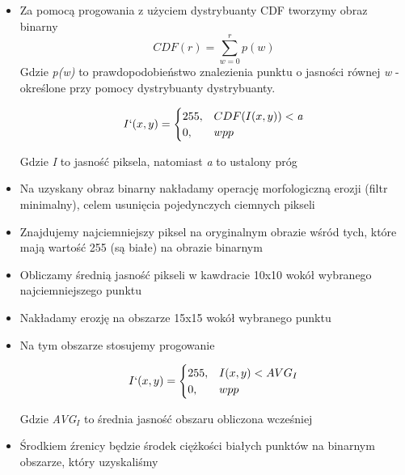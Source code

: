 \documentclass[10pt, a4paper]{article}
\begin{document}
\begin{itemize}
    \item Za pomocą progowania z użyciem dystrybuanty CDF tworzymy obraz binarny\\
    \begin{equation}
        CDF(r) = \sum_{w=0}^{r} p(w)
    \end{equation}
    Gdzie \textit{p(w)} to prawdopodobieństwo znalezienia punktu o jasności równej \textit{w} - określone przy pomocy dystrybuanty dystrybuanty.
    
    \begin{equation}
        I`(x, y) = 
        \begin{cases}
            255, &  CDF(I(x, y)) < \textit{a}\\
            0,   &  wpp
        \end{cases}
    \end{equation} 
    
    Gdzie \textit{I} to jasność piksela, natomiast \textit{a} to ustalony próg

    \item Na uzyskany obraz binarny nakładamy operację morfologiczną erozji (filtr minimalny), celem usunięcia pojedynczych ciemnych pikseli
    
    \item Znajdujemy najciemniejszy piksel na oryginalnym obrazie wśród tych, które mają wartość 255 (są białe) na obrazie binarnym
    
    \item Obliczamy średnią jasność pikseli w kawdracie 10x10 wokół wybranego najciemniejszego punktu
    
    \item Nakładamy erozję na obszarze 15x15 wokół wybranego punktu
    \item Na tym obszarze stosujemy progowanie
    
    \begin{equation}
        I`(x, y) = 
        \begin{cases}
            255, &  I(x, y) < AVG_I\\
            0,   &  wpp
        \end{cases}
    \end{equation}
    
    Gdzie \textit{AVG$_I$} to średnia jasność obszaru obliczona wcześniej
    
    \item Środkiem źrenicy będzie środek ciężkości białych punktów na binarnym obszarze, który uzyskaliśmy

\end{itemize}
\end{document}
